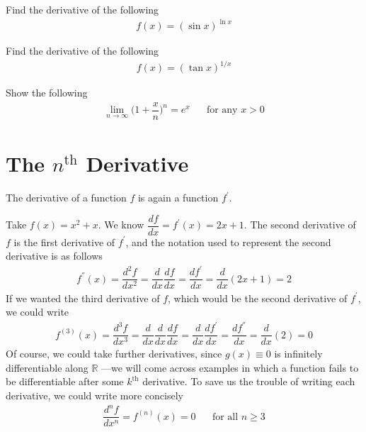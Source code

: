 \begin{exercise}
Find the derivative of the following
\begin{align*}
    f(x) = (\sin x)^{\ln x}
\end{align*}
\end{exercise}

\begin{exercise}
Find the derivative of the following
\begin{align*}
    f(x) = (\tan x)^{1/x}
\end{align*}
\end{exercise}

\begin{exercise}
Show the following
\begin{align*}
    \lim_{n \longrightarrow \infty} \Big(1+\dfrac{x}{n}\Big)^{n} = e^{x} \hspace{20pt} \text{for any} \hspace{4pt} x > 0
\end{align*}
\end{exercise}

\newpage
\section{The $n^{\text{th}}$ Derivative}

\begin{note}
The derivative of a function $f$ is again a function $f^{'}$. 
\end{note}

\begin{example}
Take $f(x) = x^{2} + x$. We know $\dfrac{df}{dx} = f^{'}(x) = 2x + 1$. The second derivative of $f$ is the first derivative of $f^{'}$, and the notation used to represent the second derivative is as follows
\begin{align*}
    f^{''}(x) = \dfrac{d^{2}f}{dx^{2}} = \dfrac{d}{dx}\dfrac{df}{dx} = \dfrac{df^{'}}{dx} =  \dfrac{d}{dx} (2x + 1) = 2  
\end{align*}
If we wanted the third derivative of $f$, which would be the second derivative of $f^{'}$, we could write
\begin{align*}
    f^{(3)}(x) = \dfrac{d^{3}f}{dx^{3}} = \dfrac{d}{dx}\dfrac{d}{dx}\dfrac{df}{dx} = \dfrac{d}{dx}\dfrac{df^{'}}{dx} = \dfrac{df^{''}}{dx} = \dfrac{d}{dx} (2) = 0
\end{align*}
Of course, we could take further derivatives, since $g(x) \equiv 0$ is infinitely differentiable along $\mathbb{R}$ ---we will come across examples in which a function fails to be differentiable after some $k^{\text{th}}$ derivative. To save us the trouble of writing each derivative, we could write more concisely
\begin{align*}
    \dfrac{d^{n}f}{dx^{n}} = f^{(n)}(x) = 0 \hspace{20pt} \text{for all} \hspace{4pt} n \geq 3
\end{align*}
\end{example}


